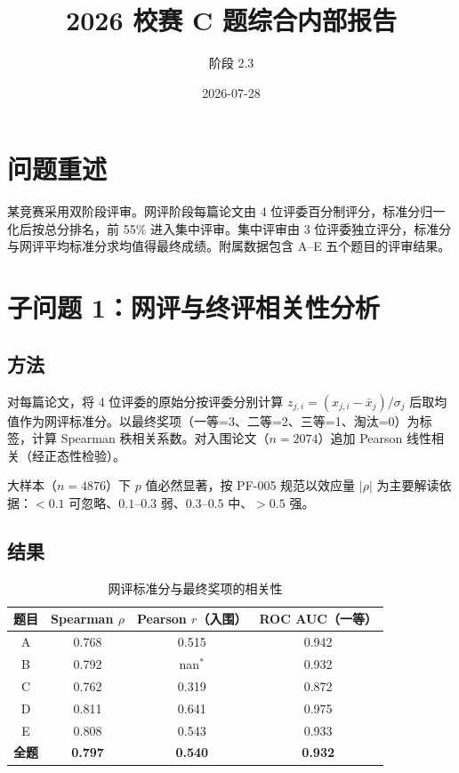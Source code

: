 \documentclass[UTF8]{ctexart}
\title{2026 校赛 C 题综合内部报告}
\author{阶段 2.3}
\date{2026-07-28}
\begin{document}
\maketitle

\section{问题重述}

某竞赛采用双阶段评审。网评阶段每篇论文由 4 位评委百分制评分，标准分归一化后按总分排名，前 55\% 进入集中评审。集中评审由 3 位评委独立评分，标准分与网评平均标准分求均值得最终成绩。附属数据包含 A--E 五个题目的评审结果。

\section{子问题 1：网评与终评相关性分析}

\subsection{方法}

对每篇论文，将 4 位评委的原始分按评委分别计算 $z_{j,i} = (x_{j,i} - \bar{x}_j) / \sigma_j$ 后取均值作为网评标准分。以最终奖项（一等=3、二等=2、三等=1、淘汰=0）为标签，计算 Spearman 秩相关系数。对入围论文（$n=2074$）追加 Pearson 线性相关（经正态性检验）。

大样本（$n=4876$）下 $p$ 值必然显著，按 PF-005 规范以效应量 $|\rho|$ 为主要解读依据：$<0.1$ 可忽略、$0.1$--$0.3$ 弱、$0.3$--$0.5$ 中、$>0.5$ 强。

\subsection{结果}

\begin{table}[h]
\centering
\caption{网评标准分与最终奖项的相关性}
\begin{tabular}{cccc}
\toprule
题目 & Spearman $\rho$ & Pearson $r$（入围） & ROC AUC（一等）\\
\midrule
A & 0.768 & 0.515 & 0.942 \\
B & 0.792 & nan$^*$ & 0.932 \\
C & 0.762 & 0.319 & 0.872 \\
D & 0.811 & 0.641 & 0.975 \\
E & 0.808 & 0.543 & 0.933 \\
\textbf{全题} & \textbf{0.797} & \textbf{0.540} & \textbf{0.932} \\
\bottomrule
\end{tabular}
\end{table}
\end{document}
